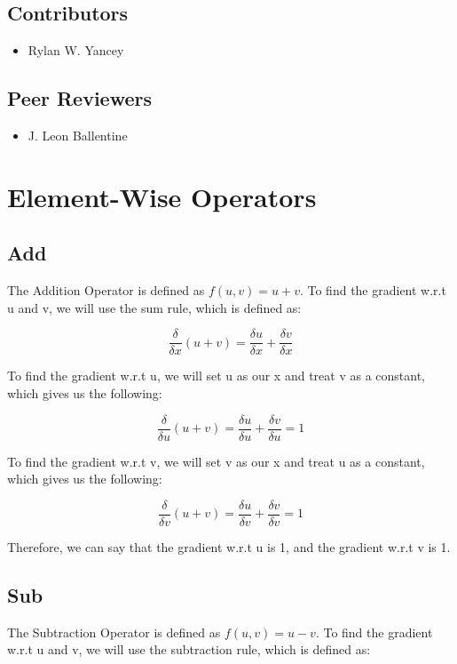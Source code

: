 \documentclass{report}
\begin{document}
    \section{Contributors}
    \begin{itemize}
        \item Rylan W. Yancey
    \end{itemize}

    \section{Peer Reviewers}
    \begin{itemize}
        \item J. Leon Ballentine
    \end{itemize}

    \chapter{Element-Wise Operators}

        \section{Add}
            The Addition Operator is defined as $f(u,v) = u + v$. To find the gradient w.r.t u and v, 
            we will use the sum rule, which is defined as: 

            $$\frac{\delta}{\delta{x}}(u + v) = \frac{\delta{u}}{\delta{x}} + \frac{\delta{v}}{\delta{x}}$$

            To find the gradient w.r.t u, we will set u as our x and treat v as a constant, 
            which gives us the following:

            $$\frac{\delta}{\delta{u}}(u + v) = \frac{\delta{u}}{\delta{u}} + \frac{\delta{v}}{\delta{u}} = 1$$

            To find the gradient w.r.t v, we will set v as our x and treat u as a constant, 
            which gives us the following:

            $$\frac{\delta}{\delta{v}}(u + v) = \frac{\delta{u}}{\delta{v}} + \frac{\delta{v}}{\delta{v}} = 1$$

            Therefore, we can say that the gradient w.r.t u is 1, and the gradient w.r.t v is 1.

        \section{Sub}
            The Subtraction Operator is defined as $f(u,v) = u - v$. To find the gradient w.r.t u and v, 
            we will use the subtraction rule, which is defined as: 
        
\end{document}
